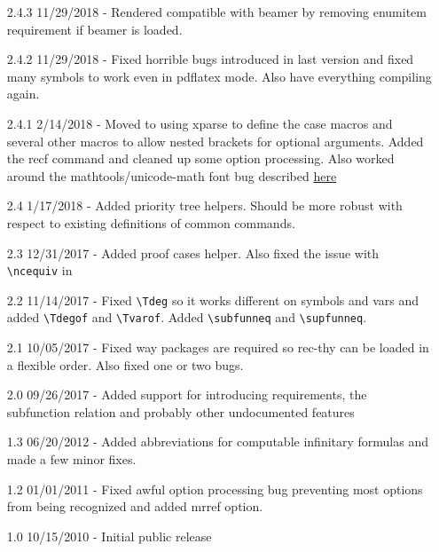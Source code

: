 \documentclass[leqno,11pt]{amsart}
\begin{document}
\begin{itemize}
	\item[2.4.3] 11/29/2018 - Rendered compatible with beamer by removing enumitem requirement if beamer is loaded.
	\item[2.4.2] 11/29/2018 - Fixed horrible bugs introduced in last version and fixed many symbols to work even in pdflatex mode.  Also have everything compiling again.
	\item[2.4.1] 2/14/2018 - Moved to using xparse to define the case macros and several other macros to allow nested brackets for optional arguments.  Added the recf command and cleaned up some option processing.  Also worked around the mathtools/unicode-math font bug described \href{https://tex.stackexchange.com/questions/335164/incompatibility-with-mathtools-and-unicode-math-in-xelatex/335177}{here}
	\item[2.4] 1/17/2018 - Added priority tree helpers.  Should be more robust with respect to existing definitions of common commands.
	\item[2.3] 12/31/2017 - Added proof cases helper.  Also fixed the issue with \verb=\ncequiv= in \XeLaTeX
	\item[2.2] 11/14/2017 - Fixed \verb=\Tdeg= so it works different on symbols and vars and added \verb=\Tdegof= and \verb=\Tvarof=.  Added \verb=\subfunneq= and \verb=\supfunneq=.
	\item[2.1] 10/05/2017 - Fixed way packages are required so rec-thy can be loaded in a flexible order.  Also fixed one or two bugs.
	\item[2.0] 09/26/2017 - Added support for introducing requirements, the subfunction relation and probably other undocumented features
	\item[1.3] 06/20/2012 - Added abbreviations for computable infinitary formulas and made a few minor fixes.
	\item[1.2] 01/01/2011 - Fixed awful option processing bug preventing most options from being recognized and added mrref option.
	\item[1.0] 10/15/2010 - Initial public release
\end{itemize}
\end{document}
